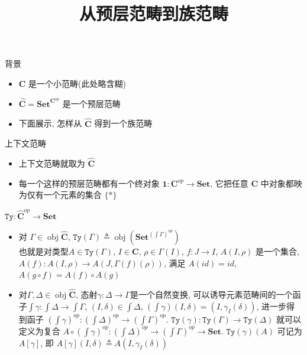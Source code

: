 \documentclass[aspectratio=169,xcolor=dvipsnames]{beamer}
\title{从预层范畴到族范畴}
\date{}
\newcommand\Ty{\mathtt{Ty}}
\newcommand\bfone{\mathbf{1}}
\newcommand\Set{\mathbf{Set}}
\newcommand\C{\mathbf{C}}
\newcommand\psC{\widehat{\mathbf{C}}}
\DeclareMathOperator\obj{obj}
\begin{document}
\begin{frame}
    \titlepage
\end{frame}

\begin{frame}{背景}
\begin{itemize}
  \item $\C$ 是一个小范畴(此处略含糊)
  \item $\widehat{\C}=\Set^{\C^{op}}$ 是一个预层范畴
  \item 下面展示, 怎样从 $\widehat{\C}$ 得到一个族范畴
\end{itemize}
\end{frame}

\begin{frame}{上下文范畴}
\begin{itemize}
  \pause
  \item 上下文范畴就取为 $\widehat{\C}$
  \pause
  \item 每一个这样的预层范畴都有一个终对象 $\bfone: \C^{op} \to \Set$, 它把任意 $\C$ 中对象都映为仅有一个元素的集合 $\{\ast\}$
\end{itemize}
\end{frame}

\begin{frame}{$\Ty:\psC^{op}\to\Set$}
  \begin{itemize}
    \item 对 $\Gamma\in\obj\psC$, $\Ty(\Gamma)\triangleq \obj(\Set^{(\int\Gamma)^{op}})$ \\
    也就是对类型$A\in\Ty(\Gamma)$, $I\in\C$, $\rho\in\Gamma(I)$, $f:J\to I$, $A(I,\rho)$ 是一个集合, $A(f) : A(I,\rho) \to A(J,\Gamma(f)(\rho))$, 满足 $A(id) = id$, $A(g\circ f) = A(f)\circ A(g)$
    \item 对$\Gamma,\Delta\in\obj\psC$, 态射$\gamma:\Delta\to\Gamma$是一个自然变换, 可以诱导元素范畴间的一个函子$\int\gamma:\int\Delta\to\int\Gamma$, $(I,\delta)\in\int\Delta$, $(\int\gamma)(I,\delta)=(I,\gamma_{I}(\delta))$, 进一步得到函子 $(\int\gamma)^{op}:(\int\Delta)^{op}\to(\int\Gamma)^{op}$. $\Ty(\gamma):\Ty(\Gamma)\to\Ty(\Delta)$ 就可以定义为复合 $A\circ(\int\gamma)^{op}:(\int\Delta)^{op}\to(\int\Gamma)^{op}\to\Set$. $\Ty(\gamma)(A)$ 可记为 $A[\gamma]$, 即 $A[\gamma](I,\delta)\triangleq A(I,\gamma_{I}(\delta))$
  \end{itemize}
\end{frame}
\end{document}
